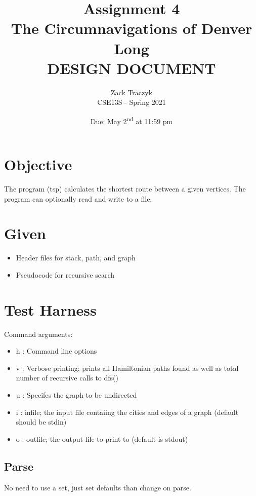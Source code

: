 \documentclass[12pt]{article}
\title{%
\textbf{Assignment 4 \\ 
The Circumnavigations of Denver Long \\
\large DESIGN DOCUMENT} }
\author{Zack Traczyk \\ CSE13S - Spring 2021}
\date{Due: May 2\textsuperscript{nd} at 11:59 pm}
\begin{document}
    \maketitle

	\section{Objective}

	The program (tsp) calculates the shortest route between a given vertices.
	The program can optionally read and write to a file.

	\section{Given}

	\begin{itemize}
		\item{Header files for stack, path, and graph}
		\item{Pseudocode for recursive search}
	\end{itemize}


	\section{Test Harness}

	Command arguments:

	\begin{itemize}
		\item{h : Command line options }
		\item{v : Verbose printing; prints all Hamiltonian paths found as well
			as total number of recursive calls to dfs()}
		\item{u : Specifes the graph to be undirected}
		\item{i : infile; the input file contaiing the cities and edges of a graph (default should be stdin)}
		\item{o : outfile; the output file to print to (default is stdout)}
	\end{itemize}

	\subsection{Parse}

	No need to use a set, just set defaults than change on parse.
\end{document}
